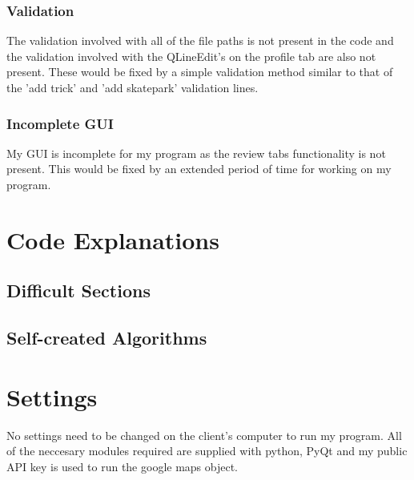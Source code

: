 \subsubsection{Validation}

The validation involved with all of the file paths is not present in the code and the validation involved with the QLineEdit's on the profile tab are also not present. These would be fixed by a simple validation method similar to that of the 'add trick' and 'add skatepark' validation lines.

\subsubsection{Incomplete GUI}

My GUI is incomplete for my program as the review tabs functionality is not present. This would be fixed by an extended period of time for working on my program.









\section{Code Explanations}

\subsection{Difficult Sections}

\subsection{Self-created Algorithms}













\section{Settings}

No settings need to be changed on the client's computer to run my program. All of the neccesary modules required are supplied with python, PyQt and my public API key is used to run the google maps object.





